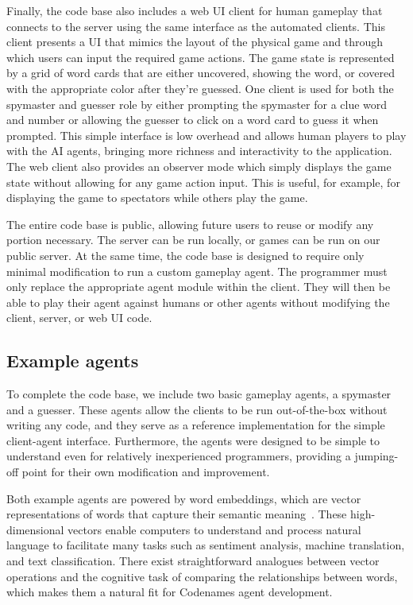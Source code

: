 \documentclass[phd,electronic,oneside,twosidetoc,letterpaper,chaptercenter,parttop,lof]{byumsphd}
\begin{document}
Finally, the code base also includes a web UI client for human gameplay that connects to the server using the same interface as the automated clients. This client presents a UI that mimics the layout of the physical game and through which users can input the required game actions. The game state is represented by a grid of word cards that are either uncovered, showing the word, or covered with the appropriate color after they're guessed. One client is used for both the spymaster and guesser role by either prompting the spymaster for a clue word and number or allowing the guesser to click on a word card to guess it when prompted. This simple interface is low overhead and allows human players to play with the AI agents, bringing more richness and interactivity to the application. The web client also provides an observer mode which simply displays the game state without allowing for any game action input. This is useful, for example, for displaying the game to spectators while others play the game.

The entire code base is public, allowing future users to reuse or modify any portion necessary. The server can be run locally, or games can be run on our public server. At the same time, the code base is designed to require only minimal modification to run a custom gameplay agent. The programmer must only replace the appropriate agent module within the client. They will then be able to play their agent against humans or other agents without modifying the client, server, or web UI code.

\subsection{Example agents}
To complete the code base, we include two basic gameplay agents, a spymaster and a guesser. These agents allow the clients to be run out-of-the-box without writing any code, and they serve as a reference implementation for the simple client-agent interface. Furthermore, the agents were designed to be simple to understand even for relatively inexperienced programmers, providing a jumping-off point for their own modification and improvement.

Both example agents are powered by word embeddings, which are vector representations of words that capture their semantic meaning~\cite{mikolov2013distributed}. These high-dimensional vectors enable computers to understand and process natural language to facilitate many tasks such as sentiment analysis, machine translation, and text classification. There exist straightforward analogues between vector operations and the cognitive task of comparing the relationships between words, which makes them a natural fit for Codenames agent development.
\end{document}

